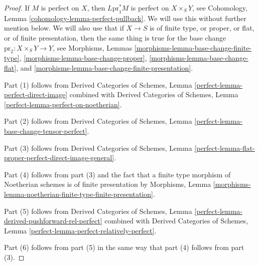\begin{proof}
If $M$ is perfect on $X$, then $L\text{pr}_1^*M$
is perfect on $X \times_S Y$, see
Cohomology, Lemma \ref{cohomology-lemma-perfect-pullback}.
We will use this without further mention below.
We will also use that if $X \to S$ is of finite type, or proper, or
flat, or of finite presentation, then the same thing is true for
the base change $\text{pr}_2 : X \times_S Y \to Y$, see
Morphisms, Lemmas
\ref{morphisms-lemma-base-change-finite-type},
\ref{morphisms-lemma-base-change-proper},
\ref{morphisms-lemma-base-change-flat}, and
\ref{morphisms-lemma-base-change-finite-presentation}.

\medskip\noindent
Part (1) follows from
Derived Categories of Schemes, Lemma \ref{perfect-lemma-perfect-direct-image}
combined with
Derived Categories of Schemes, Lemma \ref{perfect-lemma-perfect-on-noetherian}.

\medskip\noindent
Part (2) follows from
Derived Categories of Schemes, Lemma
\ref{perfect-lemma-base-change-tensor-perfect}.

\medskip\noindent
Part (3) follows from
Derived Categories of Schemes, Lemma
\ref{perfect-lemma-flat-proper-perfect-direct-image-general}.

\medskip\noindent
Part (4) follows from part (3) and the fact that a finite type
morphism of Noetherian schemes is of finite presentation by Morphisms, Lemma
\ref{morphisms-lemma-noetherian-finite-type-finite-presentation}.

\medskip\noindent
Part (5) follows from
Derived Categories of Schemes, Lemma
\ref{perfect-lemma-derived-pushforward-rel-perfect} combined with
Derived Categories of Schemes, Lemma
\ref{perfect-lemma-perfect-relatively-perfect}.

\medskip\noindent
Part (6) follows from part (5) in the same way that part (4) follows from
part (3).
\end{proof}

